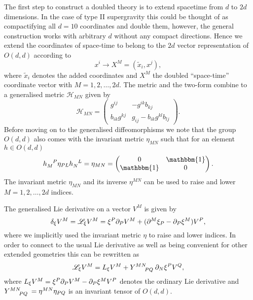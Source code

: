 The first step to construct a doubled theory is to extend spacetime from $d$ to $2d$ dimensions. In the case of type II supergravity this could be thought of as compactifying all $d=10$ coordinates and double them, however, the general construction works with arbitrary $d$ without any compact directions. Hence we extend the coordinates of space-time to belong to the $2d$ vector representation of $O(d,d)$ according to 
\begin{equation}
    x^{i}\to X^M = (\tilde{x}_i,x^j),
\end{equation}
where $\tilde{x}_i$ denotes the added coordinates and $X^M$ the doubled ``space-time'' coordinate vector with $M=1,2,\ldots,2d$. The metric and the two-form combine to a generalised metric $\mathcal{H}_{MN}$ given by 
\begin{equation}
    \mathcal{H}_{MN} = \begin{pmatrix}g^{ij} & -g^{ik}b_{kj}\\
                            b_{ik}g^{kj} & g_{ij}-b_{ik}g^{kl}b_{lj}\end{pmatrix}.
\end{equation}
Before moving on to the generalised diffeomorphisms we note that the group $O(d,d)$ also comes with the invariant metric $\eta_{MN}$ such that for an element $h\in O(d,d)$
\begin{equation}
\tensor{h}{_M^P}\eta_{PL}\tensor{h}{_N^L} = \eta_{MN} = \begin{pmatrix}0&\mathbbm{1}\\ \mathbbm{1}&0\end{pmatrix}.
\end{equation}
The invariant metric $\eta_{MN}$ and its inverse $\eta^{MN}$ can be used to raise and lower $M=1,2,\ldots,2d$ indices. 

The generalised Lie derivative on a vector $V^M$ is given by 
\begin{equation}
    \delta_\xi V^M = \mathscr{L}_\xi V^M = \xi^P\partial_P V^M+(\partial^M \xi_P-\partial_P\xi^M)V^P,
\end{equation}
where we implicitly used the invariant metric $\eta$ to raise and lower indices. In order to connect to the usual Lie derivative as well as being convenient for other extended geometries this can be rewritten as 
\begin{equation}
    \mathscr{L}_\xi V^M = L_\xi V^M + \tensor{Y}{^M^N_P_Q}\pd_N\xi^PV^Q,
\end{equation}
where $L_\xi V^M=\xi^P\partial_PV^M-\partial_P\xi^M V^P$ denotes the ordinary Lie derivative and $\tensor{Y}{^M^N_P_Q}=\eta^{MN}\eta_{PQ}$ is an invariant tensor of $O(d,d)$. 

